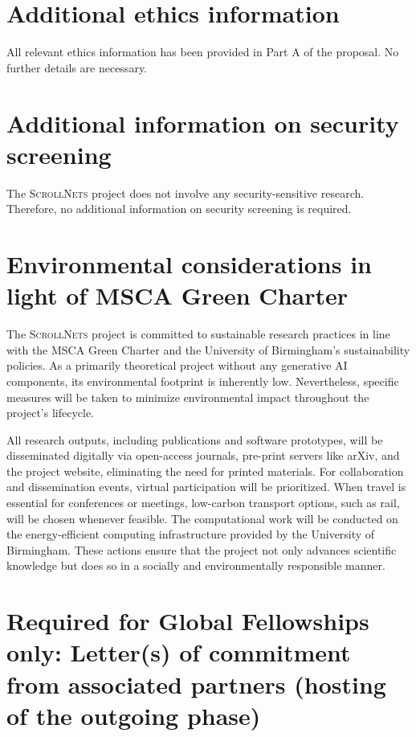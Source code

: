 \documentclass[11pt,draftproposal]{msca-pf}
\newcommand{\proj}{\small\textsc{ScrollNets}}
\begin{document}
\section{Additional ethics information}
\label{sc:ethics}

All relevant ethics information has been provided in Part A of the proposal. No further details are necessary.

\section{Additional information on security screening}
\label{sc:security}

The {\proj} project does not involve any security-sensitive research. Therefore, no additional
information on security screening is required.

\section{Environmental considerations in light of MSCA Green Charter}
\label{sc:environment}

The {\proj} project is committed to sustainable research practices in line with the MSCA Green
Charter and the University of Birmingham's sustainability policies. As a primarily theoretical
project without any generative AI components, its environmental footprint is inherently low.
Nevertheless, specific measures will be taken to minimize environmental impact throughout the
project's lifecycle.

All research outputs, including publications and software prototypes, will be disseminated digitally
via open-access journals, pre-print servers like arXiv, and the project website, eliminating the
need for printed materials. For collaboration and dissemination events, virtual participation will
be prioritized. When travel is essential for conferences or meetings, low-carbon transport options,
such as rail, will be chosen whenever feasible. The computational work will be conducted on the
energy-efficient computing infrastructure provided by the University of Birmingham. These actions
ensure that the project not only advances scientific knowledge but does so in a socially and
environmentally responsible manner.

\section{
    Required for Global Fellowships only: Letter(s) of commitment from
    associated partners (hosting of the outgoing phase)}
\label{sc:commitment_letter}
\end{document}
